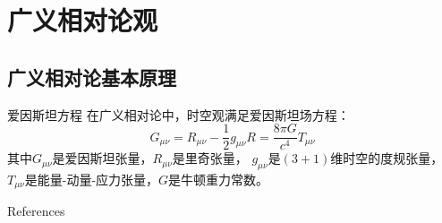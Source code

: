 \documentclass[10pt,aspectratio=43,mathserif]{beamer}
\begin{document}
\section{广义相对论观}
\subsection{广义相对论基本原理}

\begin{frame}{爱因斯坦方程}
    在广义相对论中，时空观满足爱因斯坦场方程：
    \begin{equation}
        G_{\mu \nu } = R_{\mu \nu} - \frac{1}{2}g_{\mu \nu}R=\frac{8\pi G}{c^4}T_{\mu \nu}
        \label{eq:EinEq}
    \end{equation} 
    其中$G_{\mu \nu}$是爱因斯坦张量，$R_{\mu \nu}$是里奇张量，
    $g_{\mu \nu}$是$(3+1)$维时空的度规张量，$T_{\mu \nu}$是能量-动量-应力张量，$G$是牛顿重力常数。
\end{frame}


\begin{frame}[allowframebreaks]{References}
	
	
\end{frame}
\end{document}
